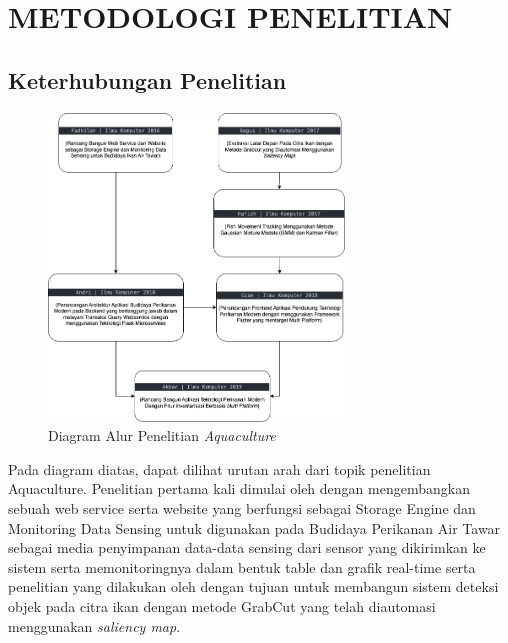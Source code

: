 
\chapter{METODOLOGI PENELITIAN}

\section{Keterhubungan Penelitian}

\begin{figure}[H]
	\centering
	\includegraphics[width=0.7\textwidth]{gambar/akbar/research_tree.png}
	\caption{Diagram Alur Penelitian \textit{Aquaculture}}
\end{figure}

Pada diagram diatas, dapat dilihat urutan arah dari topik penelitian Aquaculture. Penelitian pertama kali dimulai oleh \citep{fadhil2021} dengan mengembangkan sebuah web service serta website yang berfungsi sebagai Storage Engine dan Monitoring Data Sensing untuk digunakan pada Budidaya Perikanan Air Tawar sebagai media penyimpanan data-data sensing dari sensor yang dikirimkan ke sistem serta memonitoringnya dalam bentuk table dan grafik real-time serta penelitian yang dilakukan oleh \citep{bagus2022} dengan tujuan untuk membangun sistem deteksi objek pada citra ikan dengan metode GrabCut yang telah diautomasi menggunakan \textit{saliency map}. 

